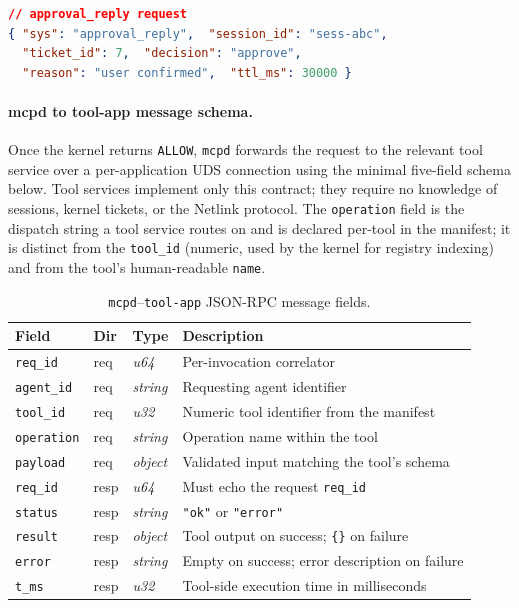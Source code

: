 \begin{lstlisting}[style=codestyle, language=json, caption={approval\_reply message (llm-app $\to$ mcpd, issued after user confirms a deferred operation).}]
// approval_reply request
{ "sys": "approval_reply",  "session_id": "sess-abc",
  "ticket_id": 7,  "decision": "approve",
  "reason": "user confirmed",  "ttl_ms": 30000 }
\end{lstlisting}

\paragraph{mcpd to tool-app message schema.}

Once the kernel returns \texttt{ALLOW}, \texttt{mcpd} forwards the request to the relevant tool service over a per-application UDS connection using the minimal five-field schema below.
Tool services implement only this contract; they require no knowledge of sessions, kernel tickets, or the Netlink protocol.
The \texttt{operation} field is the dispatch string a tool service routes on and is declared per-tool in the manifest; it is distinct from the \texttt{tool\_id} (numeric, used by the kernel for registry indexing) and from the tool's human-readable \texttt{name}.

\begin{table}[H]
\centering
\caption{\texttt{mcpd}--\texttt{tool-app} JSON-RPC message fields.}
\label{tab:mcpd-toolapp}
\small
\begin{tabular}{@{}lll p{5.5cm}@{}}
\toprule
\textbf{Field} & \textbf{Dir} & \textbf{Type} & \textbf{Description} \\
\midrule
\texttt{req\_id}   & req  & \textit{u64}    & Per-invocation correlator \\
\texttt{agent\_id} & req  & \textit{string} & Requesting agent identifier \\
\texttt{tool\_id}  & req  & \textit{u32}    & Numeric tool identifier from the manifest \\
\texttt{operation} & req  & \textit{string} & Operation name within the tool \\
\texttt{payload}   & req  & \textit{object} & Validated input matching the tool's schema \\
\midrule
\texttt{req\_id}   & resp & \textit{u64}    & Must echo the request \texttt{req\_id} \\
\texttt{status}    & resp & \textit{string} & \texttt{"ok"} or \texttt{"error"} \\
\texttt{result}    & resp & \textit{object} & Tool output on success; \texttt{\{\}} on failure \\
\texttt{error}     & resp & \textit{string} & Empty on success; error description on failure \\
\texttt{t\_ms}     & resp & \textit{u32}    & Tool-side execution time in milliseconds \\
\bottomrule
\end{tabular}
\end{table}

